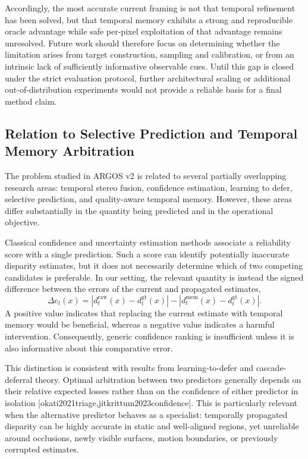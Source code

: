 \documentclass[11pt,a4paper]{article}
\providecommand{\citep}[1]{[#1]}
\begin{document}
Accordingly, the most accurate current framing is not that temporal refinement has been solved, but that temporal memory exhibits a strong and reproducible oracle advantage while safe per-pixel exploitation of that advantage remains unresolved. Future work should therefore focus on determining whether the limitation arises from target construction, sampling and calibration, or from an intrinsic lack of sufficiently informative observable cues. Until this gap is closed under the strict evaluation protocol, further architectural scaling or additional out-of-distribution experiments would not provide a reliable basis for a final method claim.

\subsection{Relation to Selective Prediction and Temporal Memory Arbitration}
\label{sec:related_selective_temporal}

The problem studied in ARGOS v2 is related to several partially overlapping research areas: temporal stereo fusion, confidence estimation, learning to defer, selective prediction, and quality-aware temporal memory. However, these areas differ substantially in the quantity being predicted and in the operational objective.

Classical confidence and uncertainty estimation methods associate a reliability score with a single prediction. Such a score can identify potentially inaccurate disparity estimates, but it does not necessarily determine which of two competing candidates is preferable. In our setting, the relevant quantity is instead the signed difference between the errors of the current and propagated estimates,
\begin{equation}
    \Delta e_t(x)
    =
    \left|d_t^{\mathrm{raw}}(x)-d_t^{\mathrm{gt}}(x)\right|
    -
    \left|d_t^{\mathrm{mem}}(x)-d_t^{\mathrm{gt}}(x)\right|.
\end{equation}
A positive value indicates that replacing the current estimate with temporal memory would be beneficial, whereas a negative value indicates a harmful intervention. Consequently, generic confidence ranking is insufficient unless it is also informative about this comparative error.

This distinction is consistent with results from learning-to-defer and cascade-deferral theory. Optimal arbitration between two predictors generally depends on their relative expected losses rather than on the confidence of either predictor in isolation \citep{okati2021triage,jitkrittum2023confidence}. This is particularly relevant when the alternative predictor behaves as a specialist: temporally propagated disparity can be highly accurate in static and well-aligned regions, yet unreliable around occlusions, newly visible surfaces, motion boundaries, or previously corrupted estimates.
\end{document}
